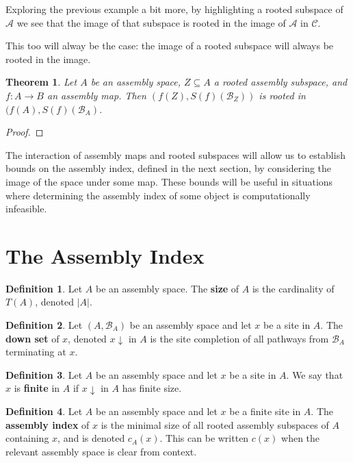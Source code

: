 \documentclass[aps,prd,onecolumn,nofootinbib,letterpaper,preprintnumbers,superscriptaddress,eqsecnum]{revtex4}
\newtheorem{theorem}{Theorem}
\theoremstyle{definition}
\newtheorem{definition}{Definition}
\newcommand{\downset}[1]{#1\!\!\downarrow}
\newcommand{\B}{\mathcal{B}}
\newcommand{\C}{\mathcal{C}}
\newcommand{\A}{\mathcal{A}}
\newcommand{\red}[1]{{\color{red}#1}}
\newcommand{\TODO}[1]{\noindent\red{\textbf{TODO:}~#1}}
\begin{document}
Exploring the previous example a bit more, by highlighting a rooted subspace of $\A$ we see that the image of that subspace is rooted in the image of $\A$ in $\C$.

\TODO{Example Figure}

This too will alway be the case: the image of a rooted subspace will always be rooted in the image.
\begin{theorem}\label{thm:rooted-image}
    Let $A$ be an assembly space, $Z \subseteq A$ a rooted assembly subspace, and $f : A \rightarrow B$ an assembly map.
    Then $(f(Z), S(f)(\B_Z))$ is rooted in $(f(A), S(f)(\B_A)$.
\end{theorem}
\begin{proof}
    \TODO{Complete}
\end{proof}

The interaction of assembly maps and rooted subspaces will allow us to establish bounds on the assembly index, defined in the next section, by considering the image of the space under some map.
These bounds will be useful in situations where determining the assembly index of some object is computationally infeasible.

\section{The Assembly Index}\label{sec:assembly-index}

\begin{definition}\label{def:size}
    Let $A$ be an assembly space.
    The \textbf{size} of $A$ is the cardinality of $T(A)$, denoted $|A|$.
\end{definition}

\begin{definition}\label{def:downset}
    Let $(A, \B_A)$ be an assembly space and let $x$ be a site in $A$.
    The \textbf{down set} of $x$, denoted $\downset{x}$ in $A$ is the site completion of all pathways from $\B_A$ terminating at $x$.
\end{definition}

\begin{definition}\label{def:finiteness}
    Let $A$ be an assembly space and let $x$ be a site in $A$.
    We say that $x$ is \textbf{finite} in $A$ if $\downset{x}$ in $A$ has finite size.
\end{definition}

\begin{definition}\label{def:index}
    Let $A$ be an assembly space and let $x$ be a finite site in $A$.
    The \textbf{assembly index} of $x$ is the minimal size of all rooted assembly subspaces of $A$ containing $x$, and is denoted $c_A(x)$.
    This can be written $c(x)$ when the relevant assembly space is clear from context.
\end{definition}
\end{document}
